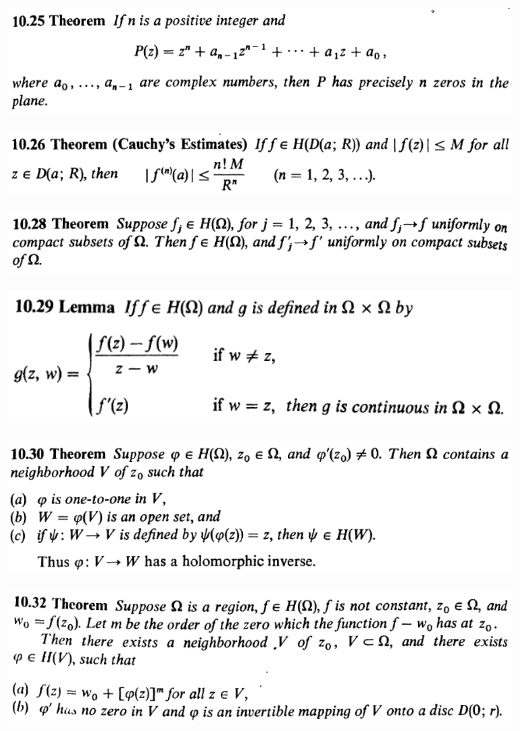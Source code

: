 \documentclass[12pt]{article}
\begin{document}
		\begin{center}
		\includegraphics{10ponto25}
		\end{center}

		\begin{center}
		\includegraphics{10ponto26}
		\end{center}

		\begin{center}
		\includegraphics{10ponto28}
		\end{center}

		\begin{center}
		\includegraphics{10ponto29}
		\end{center}

		\begin{center}
		\includegraphics{10ponto30}
		\end{center}

		\begin{center}
		\includegraphics{10ponto32}
		\end{center}
\end{document}
